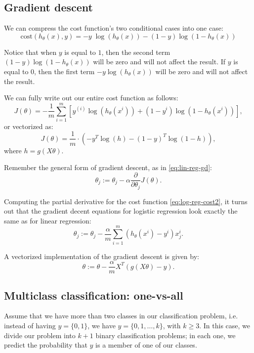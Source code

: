 \documentclass[a4paper,11pt]{report}
\newcommand{\cost}{\mathrm{cost}}
\begin{document}
\subsection*{Gradient descent}

 We can compress the cost function's two conditional cases into one case: $$\cost(h_\theta(x),y) = - y \; \log(h_\theta(x)) - (1 - y) \log(1 - h_\theta(x))$$

Notice that when $y$ is equal to $1$, then the second term $(1-y)\log(1-h_\theta(x))$ will be zero and will not affect the result. If $y$ is equal to $0$, then the first term $-y \log(h_\theta(x))$ will be zero and will not affect the result.

We can fully write out our entire cost function as follows:
\begin{equation}\label{eq:log-reg-cost2}
J(\theta) = - \frac{1}{m} \displaystyle \sum_{i=1}^m [y^{(i)}\log (h_\theta (x^{i})) + (1 - y^{i})\log (1 - h_\theta(x^{i}))],
\end{equation}
or vectorized as:
\begin{equation}\label{eq:log-reg-cost-vec}
J(\theta)  = \frac{1}{m} \cdot \left(-y^{T}\log(h)-(1-y)^{T}\log(1-h)\right),
\end{equation}
where $h = g(X\theta)$.

Remember the general form of gradient descent, as in \eqref{eq:lin-reg-gd}: $$\theta_j := \theta_j - \alpha \dfrac{\partial}{\partial \theta_j}J(\theta).$$

Computing the partial derivative for the cost function \eqref{eq:log-reg-cost2}, it turns out that the gradient decent equations for logistic regression look exactly the same as for linear regression:
$$\theta_j := \theta_j - \frac{\alpha}{m} \sum_{i=1}^m (h_\theta(x^{i}) - y^{i}) x_j^{i}.$$

A vectorized implementation of the gradient descent is given by: $$\theta := \theta - \frac{\alpha}{m} X^{T} (g(X \theta ) - {y}).$$

\subsection*{Multiclass classification: one-vs-all}

Assume that we have more than two classes in our classification problem, i.e. instead of having $y = \{0,1\}$, we have $y = \{0,1, \ldots, k\}$, with $k \geq 3$.
In this case, we divide our problem into $k+1$ binary classification problems; in each one, we predict the probability that $y$ is a member of one of our classes.
\end{document}

